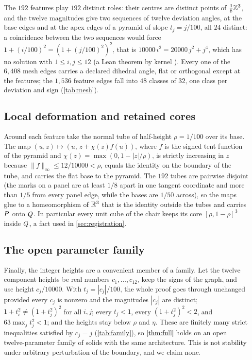 The $192$ features play $192$ distinct roles: their centres are distinct points of
$\tfrac18\mathbb{Z}^3$, and the twelve magnitudes give two sequences of twelve deviation angles, at the
base edges and at the apex edges of a pyramid of slope $t_j=j/100$, all $24$ distinct: a
coincidence between the two sequences would force $1+(i/100)^2=(1+(j/100)^2)^2$, that is
$10000\,i^2=20000\,j^2+j^4$, which has no solution with $1\le i,j\le 12$ (a Lean theorem by
kernel ). Every one of the $6{,}408$ mesh edges carries a declared dihedral angle,
flat or orthogonal except at the features; the $1{,}536$ feature edges fall into $48$ classes of
$32$, one class per deviation and sign (\cref{tab:mesh}).

\subsection{Local deformation and retained cores}\label{app:tubes}

Around each feature take the normal tube of half-height $\rho=1/100$ over its base. The map
$(u,z)\mapsto(u,\,z+\chi(z)f(u))$, where $f$ is the signed tent function of the pyramid and
$\chi(z)=\max(0,1-|z|/\rho)$, is strictly increasing in $z$ because $\|f\|_\infty\le 12/10000<\rho$,
equals the identity on the boundary of the tube, and carries the flat base to the pyramid. The
$192$ tubes are pairwise disjoint (the marks on a panel are at least $1/8$ apart in one tangent
coordinate and more than $1/5$ from every panel edge, while the bases are $1/50$ across), so the
maps glue to a homeomorphism of $\mathbb{R}^3$ that is the identity outside the tubes and carries
$P$ onto $Q$. In particular every unit cube of the chair keeps its core
$[\rho,1-\rho]^3$ inside $Q$, a fact used in \cref{sec:registration}.

\subsection{The open parameter family}\label{app:family}

Finally, the integer heights are a convenient member of a family. Let the twelve component
heights be real numbers $c_1,\dots,c_{12}$, keep the signs of the graph, and use height
$c_j/10000$. With $t_j=|c_j|/100$, the whole proof goes through unchanged provided every $c_j$ is
nonzero and the magnitudes $|c_j|$ are distinct; $1+t_i^2\ne(1+t_j^2)^2$ for all $i,j$; every
$t_j<1$, every $(1+t_j^2)^2<2$, and $63\max_j t_j^2<1$; and the heights stay below $\rho$ and
$\eta$. These are finitely many strict inequalities satisfied by $c_j=j$ (\cref{tab:family}), so
\cref{thm:full} holds on an open twelve-parameter family of solids with the same architecture.
This is not stability under arbitrary perturbation of the boundary, and we claim none.

\begin{table}[ht]
  \centering
  \caption{The parameter family: the exact open conditions of R\S11 and their values at the
  explicit member $c_j=j$, checked with exact rationals (FIGURES.md, Table 7).}
  \label{tab:family}
  \small
  
\end{table}
